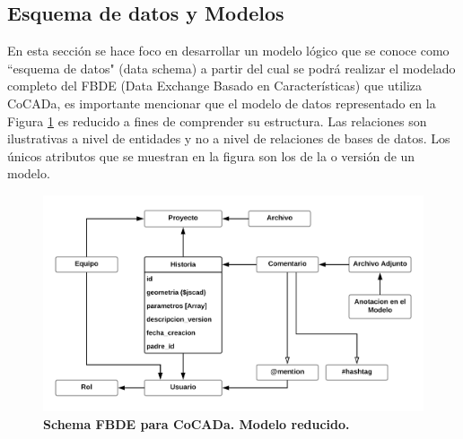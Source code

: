 \subsection{Esquema de datos y Modelos}
En esta sección se hace foco en desarrollar un modelo lógico que se conoce como ``esquema de datos" (data schema) a partir del cual se podrá realizar el modelado completo del FBDE (Data Exchange Basado en Características) que utiliza CoCADa, es importante mencionar que el modelo de datos representado en la Figura \ref{fig:schema} es reducido a fines de comprender su estructura. Las relaciones son ilustrativas a nivel de entidades y no a nivel de relaciones de bases de datos. Los únicos atributos que se muestran en la figura son los de la  o versión de un modelo.

\begin{figure}[h]
    \includegraphics[width=16cm]{Img/Desarrollo/schema.png}
    \centering
    \caption{\textbf{ \footnotesize{Schema FBDE para CoCADa. Modelo reducido.}}}
    \label{fig:schema}
\end{figure}

